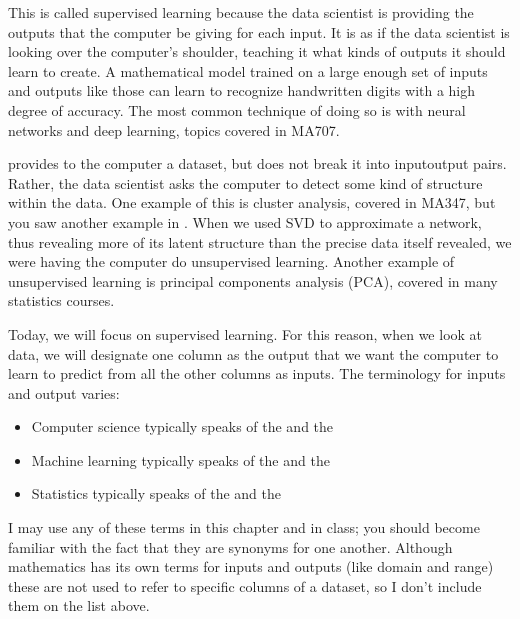 \documentclass[letterpaper,10pt,english]{sphinxmanual}
\begin{document}

This is called supervised learning because the data scientist is providing the outputs that the computer  be giving for each input.  It is as if the data scientist is looking over the computer’s shoulder, teaching it what kinds of outputs it should learn to create.  A mathematical model trained on a large enough set of inputs and outputs like those can learn to recognize handwritten digits with a high degree of accuracy.  The most common technique of doing so is with neural networks and deep learning, topics covered in MA707.

 provides to the computer a dataset, but does not break it into input\sphinxhyphen{}output pairs.  Rather, the data scientist asks the computer to detect some kind of structure within the data.  One example of this is cluster analysis, covered in MA347, but you saw another example in {\hyperref[\detokenize{chapter-16-matrices::doc}]{}}.  When we used SVD to approximate a network, thus revealing more of its latent structure than the precise data itself revealed, we were having the computer do unsupervised learning.  Another example of unsupervised learning is principal components analysis (PCA), covered in many statistics courses.

Today, we will focus on supervised learning.  For this reason, when we look at data, we will designate one column as the output that we want the computer to learn to predict from all the other columns as inputs.  The terminology for inputs and output varies:
\begin{itemize}
\item {} 
Computer science typically speaks of the  and the 

\item {} 
Machine learning typically speaks of the  and the 

\item {} 
Statistics typically speaks of the  and the 

\end{itemize}

I may use any of these terms in this chapter and in class; you should become familiar with the fact that they are synonyms for one another.  Although mathematics has its own terms for inputs and outputs (like domain and range) these are not used to refer to specific columns of a dataset, so I don’t include them on the list above.  
\end{document}

